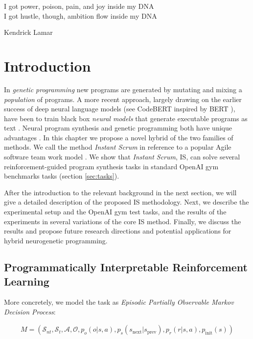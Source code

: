 \epigraph{I got power, poison, pain, and joy inside my DNA \\ I got hustle, though, ambition flow inside my DNA}{Kendrick Lamar}

\section{Introduction}\label{sec:intro}


In \emph{genetic programming} \cite{genprog1,genprog2,genprog1,genprog2ast} new programs are generated by mutating and mixing a \emph{population} of programs. 
 A more recent approach, largely drawing on the earlier success of deep neural language models (see CodeBERT \cite{codebert} inspired by BERT \cite{devlinBERTPretrainingDeep2019}), have been to train black box \emph{neural models} that generate executable programs as text \cite{abolafiaNeuralProgramSynthesis2018,deepcoder,structural}. 
 Neural program synthesis and genetic programming both have unique advantages \cite{geneticvsneural}. 
 In this chapter we propose a novel hybrid of the two families of methods. We call the method \emph{Instant Scrum} in reference to a popular Agile software team work model \cite{scrum}. We show that \emph{Instant Scrum}, IS, can solve several reinforcement-guided program synthesis tasks in standard OpenAI gym benchmarks tasks (section \ref{sec:tasks}). 

After the introduction to the relevant background in the next section, we will give a detailed description of the proposed IS methodology. Next, we describe the experimental setup and the OpenAI gym test tasks, and the results of the experiments in several variations of the core IS method. Finally, we discuss the results and propose future research directions and potential applications for hybrid neurogenetic programming. 

\newpage \subsection{Programmatically Interpretable Reinforcement Learning}
\label{sec:pirl}

More concretely, we model the task as {\em Episodic Partially Observable Markov Decision Process}:

\begin{multline}
M = (\mathcal{S}_{nt}, \mathcal{S}_t, \mathcal{A}, \mathcal{O}, p_o(o | s, a), p_s(s_\text{next} | s_\text{prev}), p_r(r | s, a), p_\text{init}(s))
\end{multline}

